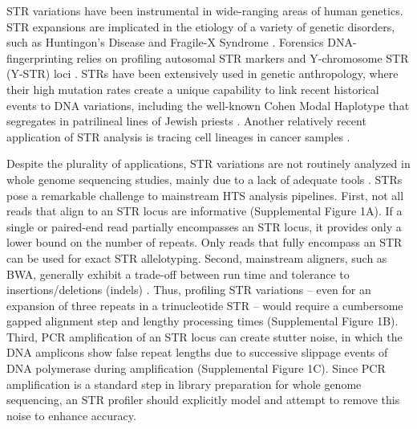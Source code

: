 STR variations have been instrumental in wide-ranging areas of human genetics. STR expansions are implicated in the etiology of a variety of genetic disorders, such as Huntingon’s Disease and Fragile-X Syndrome \cite{PearsonNicholEdamuraCleary2005,Mirkin2007}. Forensics DNA-fingerprinting relies on profiling autosomal STR markers and Y-chromosome STR (Y-STR) loci \cite{KayserKnijff2011}. STRs have been extensively used in genetic anthropology, where their high mutation rates create a unique capability to link recent historical events to DNA variations, including the well-known Cohen Modal Haplotype that segregates in patrilineal lines of Jewish priests \cite{SkoreckiSeligBlazerEtAl1997,ZhivotovskyUnderhillCinniogluEtAl2004}. Another relatively recent application of STR analysis is tracing cell lineages in cancer samples \cite{FrumkinWasserstromItzkovitzEtAl2008}.

Despite the plurality of applications, STR variations are not routinely analyzed in whole genome sequencing studies, mainly due to a lack of adequate tools \cite{TreangenSalzberg2012}. STRs pose a remarkable challenge to mainstream HTS analysis pipelines. First, not all reads that align to an STR locus are informative (Supplemental Figure 1A). If a single or paired-end read partially encompasses an STR locus, it provides only a lower bound on the number of repeats. Only reads that fully encompass an STR can be used for exact STR allelotyping. Second, mainstream aligners, such as BWA, generally exhibit a trade-off between run time and tolerance to insertions/deletions (indels) \cite{LiHomer2010}. Thus, profiling STR variations -- even for an expansion of three repeats in a trinucleotide STR -- would require a cumbersome gapped alignment step and lengthy processing times (Supplemental Figure 1B). Third, PCR amplification of an STR locus can create stutter noise, in which the DNA amplicons show false repeat lengths due to successive slippage events of DNA polymerase during amplification \cite{HaugeLitt1993,Ellegren2004} (Supplemental Figure 1C). Since PCR amplification is a standard step in library preparation for whole genome sequencing, an STR profiler should explicitly model and attempt to remove this noise to enhance accuracy.

